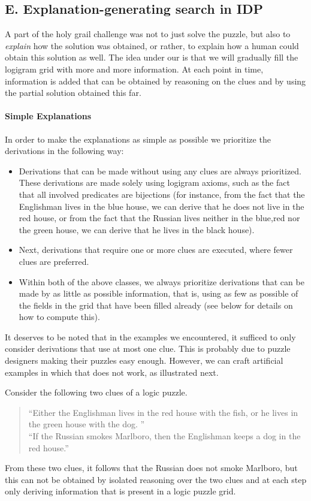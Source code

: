 \subsection{E. Explanation-generating search in IDP} 
A part of the holy grail challenge was not to just solve the puzzle, but also to \emph{explain} how the solution was obtained, or rather, to explain how a human could obtain this solution as well. 
The idea under our is that we will gradually fill the logigram grid with more and more information. At each point in time, information is added that can be obtained by reasoning on the clues and by using the partial solution obtained this far. 

\paragraph{Simple Explanations}
In order to make the explanations as simple as possible we prioritize the derivations in the following way: 
\begin{itemize}
 \item Derivations that can be made without using any clues are always prioritized. These derivations are made solely using logigram axioms, such as the fact that all involved predicates are bijections (for instance, from the fact that the Englishman lives in the blue house, we can derive that he does not live in the red house, or from the fact that the Russian lives neither in the blue,red nor the green house, we can derive that he lives in the black house). 
 \item Next, derivations that require one or more clues are executed, where fewer clues are preferred. 
 \item Within both of the above classes, we always prioritize derivations that can be made by as little as possible information, that is, using as few as possible of the fields in the grid that have been filled already (see below for details on how to compute this).
\end{itemize}
It deserves to be noted that in the examples we encountered, it sufficed to only consider derivations that use at most one clue. This is probably due to puzzle designers making their puzzles easy enough. However, we can craft artificial examples in which that does not work, as illustrated next. 
\begin{example}
 Consider the following two clues of a logic puzzle. 
 \begin{quote}
  ``Either the Englishman lives in the red house with the fish, or he lives in the green house with the dog. '' \\
  ``If the Russian smokes Marlboro, then the Englishman keeps a dog in the red house.'' 
 \end{quote}
From these two clues, it follows that the Russian does not smoke Marlboro, but this can not be obtained by isolated reasoning over the two clues and at each step only deriving information that is present in a logic puzzle grid.
\end{example}

